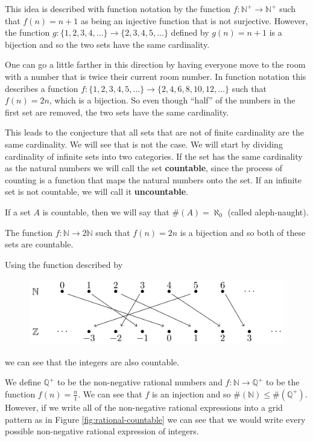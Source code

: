 \documentclass[
]{book}
\theoremstyle{definition}
\theoremstyle{definition}
\theoremstyle{definition}
\theoremstyle{remark}
\begin{document}
This idea is described with function notation by the function \(f:\mathbb{N}^+\rightarrow \mathbb{N}^+\) such that \(f(n)=n+1\) as being an injective function that is not surjective. However, the function \(g: \{1,2,3,4, \ldots\} \rightarrow \{2, 3,4,5, \ldots\}\) defined by \(g(n)=n+1\) is a bijection and so the two sets have the same cardinality.

One can go a little farther in this direction by having everyone move to the room with a number that is twice their current room number. In function notation this describes a function \(f: \{1, 2, 3, 4, 5, \ldots\} \rightarrow \{2, 4, 6, 8, 10, 12, \ldots\}\) such that \(f(n)=2n\), which is a bijection. So even though ``half'' of the numbers in the first set are removed, the two sets have the same cardinality.

This leads to the conjecture that all sets that are not of finite cardinality are the same cardinality. We will see that is not the case. We will start by dividing cardinality of infinite sets into two categories. If the set has the same cardinality as the natural numbers we will call the set \textbf{countable}, since the process of counting is a function that maps the natural numbers onto the set. If an infinite set is not countable, we will call it \textbf{uncountable}.

If a set \(A\) is countable, then we will say that \(\#(A)=\aleph_0\) (called aleph-naught).

The function \(f:\mathbb{N}\rightarrow 2\mathbb{N}\) such that \(f(n)=2n\) is a bijection and so both of these sets are countable.

Using the function described by

\begin{figure}

{\centering \includegraphics[width=1\linewidth]{tikz/table-natural-integers2} 

}

\end{figure}

we can see that the integers are also countable.

We define \(\mathbb{Q}^+\) to be the non-negative rational numbers and \(f:\mathbb{N}\rightarrow \mathbb{Q}^+\) to be the function \(f(n)=\frac{n}{1}\). We can see that \(f\) is an injection and so \(\#(\mathbb{N}) \leq \#(\mathbb{Q}^+)\). However, if we write all of the non-negative rational expressions into a grid pattern as in Figure \ref{fig:rational-countable} we can see that we would write every possible non-negative rational expression of integers.
\end{document}
